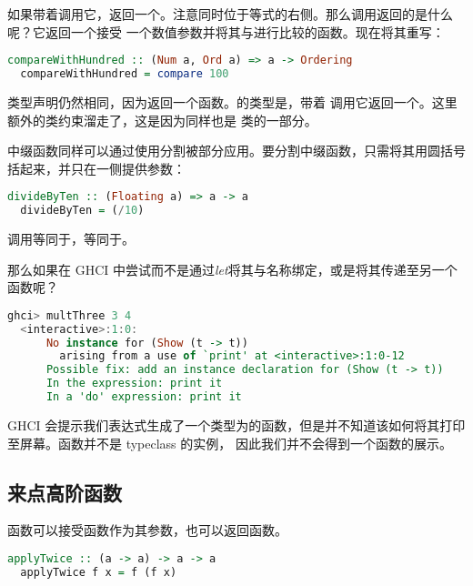 \documentclass[./main.tex]{subfiles}
\begin{document}
如果带着调用它，返回一个。注意同时位于等式的右侧。那么调用返回的是什么呢？它返回一个接受
一个数值参数并将其与进行比较的函数。现在将其重写：

\begin{lstlisting}[language=Haskell]
  compareWithHundred :: (Num a, Ord a) => a -> Ordering
  compareWithHundred = compare 100
\end{lstlisting}

类型声明仍然相同，因为返回一个函数。的类型是，带着
调用它返回一个。这里额外的类约束溜走了，这是因为同样也是
类的一部分。

中缀函数同样可以通过使用分割被部分应用。要分割中缀函数，只需将其用圆括号括起来，并只在一侧提供参数：

\begin{lstlisting}[language=Haskell]
  divideByTen :: (Floating a) => a -> a
  divideByTen = (/10)
\end{lstlisting}

调用等同于，等同于。

那么如果在 GHCI 中尝试而不是通过\textit{let}将其与名称绑定，或是将其传递至另一个函数呢？

\begin{lstlisting}[language=Haskell]
  ghci> multThree 3 4
  <interactive>:1:0:
      No instance for (Show (t -> t))
        arising from a use of `print' at <interactive>:1:0-12
      Possible fix: add an instance declaration for (Show (t -> t))
      In the expression: print it
      In a 'do' expression: print it
\end{lstlisting}

GHCI 会提示我们表达式生成了一个类型为的函数，但是并不知道该如何将其打印至屏幕。函数并不是 typeclass 的实例，
因此我们并不会得到一个函数的展示。

\subsection*{来点高阶函数}

函数可以接受函数作为其参数，也可以返回函数。

\begin{lstlisting}[language=Haskell]
  applyTwice :: (a -> a) -> a -> a
  applyTwice f x = f (f x)
\end{lstlisting}
\end{document}
